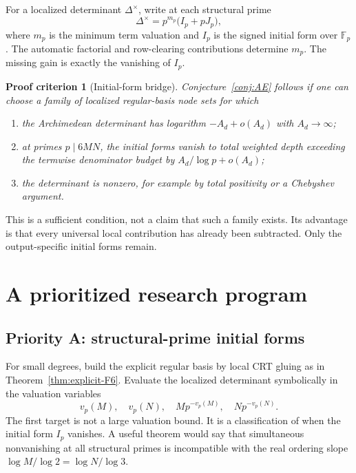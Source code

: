 \documentclass[11pt,oneside]{article}
\newtheorem{criterion}[theorem]{Proof criterion}
\theoremstyle{definition}
\theoremstyle{remark}
\newcommand{\F}{\mathbb F}
\begin{document}
For a localized determinant \(\Delta^\times\), write at each structural prime
\[
 \Delta^\times=p^{m_p}\bigl(I_p+pJ_p\bigr),
\]
where \(m_p\) is the minimum term valuation and \(I_p\) is the signed initial form over
\(\F_p\).  The automatic factorial and row-clearing contributions determine \(m_p\).
The missing gain is exactly the vanishing of \(I_p\).

\begin{criterion}[Initial-form bridge]
\label{crit:initial-form-bridge}
Conjecture~\ref{conj:AE} follows if one can choose a family of localized regular-basis
node sets for which
\begin{enumerate}
\item the Archimedean determinant has logarithm \(-A_d+o(A_d)\) with \(A_d\to\infty\);
\item at primes \(p\mid6MN\), the initial forms vanish to total weighted depth exceeding the
termwise denominator budget by \(A_d/\log p+o(A_d)\);
\item the determinant is nonzero, for example by total positivity or a Chebyshev argument.
\end{enumerate}
\end{criterion}

This is a sufficient condition, not a claim that such a family exists.  Its advantage is that
every universal local contribution has already been subtracted.  Only the output-specific
initial forms remain.

\section{A prioritized research program}
\label{sec:research-program}

\subsection{Priority A: structural-prime initial forms}

For small degrees, build the explicit regular basis by local CRT gluing as in
Theorem~\ref{thm:explicit-F6}.  Evaluate the localized determinant symbolically in the
valuation variables
\[
 v_p(M),\quad v_p(N),\quad M p^{-v_p(M)},\quad N p^{-v_p(N)}.
\]
The first target is not a large valuation bound.  It is a classification of when the initial
form \(I_p\) vanishes.  A useful theorem would say that simultaneous nonvanishing at all
structural primes is incompatible with the real ordering slope
\(\log M/\log2=\log N/\log3\).
\end{document}
